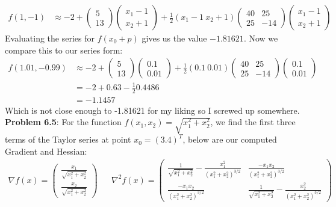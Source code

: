 \documentclass{article}
\begin{document}
\begin{align*}
    f(1,-1) & \approx 
    -2 + 
    \begin{pmatrix} 5 \\ 13 \end{pmatrix}
        \begin{pmatrix} x_1-1 \\ x_2 + 1 \end{pmatrix} 
            + \frac{1}{2}(x_1-1 \: x_2+1)
            \begin{pmatrix}
                40 & 25 \\
                25 & -14
            \end{pmatrix}
        \begin{pmatrix} x_1-1 \\ x_2 + 1 \end{pmatrix}
\end{align*}
Evaluating the series for $f(x_0 + p)$ gives us the value $-1.81621$. Now we compare this to our series form:
\begin{align*}
    f(1.01,-0.99) & \approx 
    -2 + 
    \begin{pmatrix} 5 \\ 13 \end{pmatrix}
        \begin{pmatrix} 0.1 \\ 0.01 \end{pmatrix} 
            + \frac{1}{2}(0.1 \: 0.01)
            \begin{pmatrix}
                40 & 25 \\
                25 & -14
            \end{pmatrix}
        \begin{pmatrix} 0.1 \\ 0.01 \end{pmatrix} \\
            & = -2 +0.63 - \frac{1}{2}0.4486 \\ 
            & = -1.1457
\end{align*}
Which is not close enough to -1.81621 for my liking so I screwed up somewhere. \newline \break
\textbf{Problem 6.5}: For the function $f(x_1, x_2) = \sqrt{x_1^2 + x_2^2}$, we find the first three terms of the Taylor series at point $x_0 = (3.4)^T$, below are our computed Gradient and Hessian:
\begin{align*}
    \nabla f(x) = 
    \begin{pmatrix}
        \frac{x_1}{\sqrt{x_1^2 + x_2^2}} \\  \frac{x_2}{\sqrt{x_1^2 + x_2^2}}
    \end{pmatrix} && 
    \nabla^2 f(x) =
    \begin{pmatrix}
        \frac{1}{\sqrt{x_1^2 + x_2^2}} - \frac{x_1^2}{(x_1^2 + x_2^2)^{3/2}} & \frac{-x_1 x_2}{(x_1^2 + x_2^2)^{3/2}} \\
        \frac{-x_1 x_2}{(x_1^2 + x_2^2)^{3/2}} & \frac{1}{\sqrt{x_1^2 + x_2^2}} - \frac{x_2^2}{(x_1^2 + x_2^2)^{3/2}}
    \end{pmatrix}
\end{align*}
\end{document}
